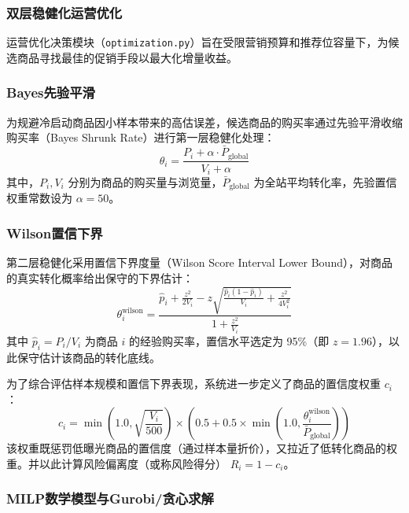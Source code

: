 \subsubsection{双层稳健化运营优化}

运营优化决策模块（\texttt{optimization.py}）旨在受限营销预算和推荐位容量下，为候选商品寻找最佳的促销手段以最大化增量收益。

\subsubsection{Bayes先验平滑}

为规避冷启动商品因小样本带来的高估误差，候选商品的购买率通过先验平滑收缩购买率（Bayes Shrunk Rate）进行第一层稳健化处理：
\begin{equation}
    \theta_i = \frac{P_i + \alpha \cdot \bar{P}_{\text{global}}}{V_i + \alpha}
\end{equation}
其中，$P_i, V_i$ 分别为商品的购买量与浏览量，$\bar{P}_{\text{global}}$ 为全站平均转化率，先验置信权重常数设为 $\alpha = 50$。

\subsubsection{Wilson置信下界}

第二层稳健化采用置信下界度量（Wilson Score Interval Lower Bound），对商品的真实转化概率给出保守的下界估计：
\begin{equation}
    \theta^{\text{wilson}}_i = \frac{\hat{p}_i + \frac{z^2}{2V_i} - z \sqrt{\frac{\hat{p}_i(1-\hat{p}_i)}{V_i} + \frac{z^2}{4V_i^2}}}{1 + \frac{z^2}{V_i}}
\end{equation}
其中 $\hat{p}_i = P_i / V_i$ 为商品 $i$ 的经验购买率，置信水平选定为 95\%（即 $z = 1.96$），以此保守估计该商品的转化底线。

为了综合评估样本规模和置信下界表现，系统进一步定义了商品的置信度权重 $c_i$：
\begin{equation}
    c_i = \min\left(1.0, \sqrt{\frac{V_i}{500}}\right) \times \left(0.5 + 0.5 \times \min\left(1.0, \frac{\theta^{\text{wilson}}_i}{\bar{P}_{\text{global}}}\right)\right)
\end{equation}
该权重既惩罚低曝光商品的置信度（通过样本量折价），又拉近了低转化商品的权重。并以此计算风险偏离度（或称风险得分） $R_i = 1 - c_i$。

\subsubsection{MILP数学模型与Gurobi/贪心求解}

